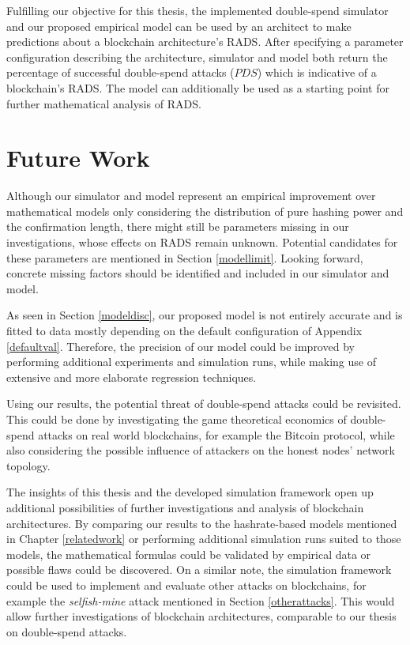 \documentclass[a4paper,12pt,twoside]{report}
\begin{document}
Fulfilling our objective for this thesis, the implemented double-spend simulator and our proposed empirical model can be used by an architect to make predictions about a blockchain architecture's RADS. After specifying a parameter configuration describing the architecture, simulator and model both return the percentage of successful double-spend attacks ($PDS$) which is indicative of a blockchain's RADS. The model can additionally be used as a starting point for further mathematical analysis of RADS.
\section{Future Work}
Although our simulator and model represent an empirical improvement over mathematical models only considering the distribution of pure hashing power and the confirmation length, there might still be parameters missing in our investigations, whose effects on RADS remain unknown. Potential candidates for these parameters are mentioned in Section \ref{modellimit}. Looking forward, concrete missing factors should be identified and included in our simulator and model.

As seen in Section \ref{modeldisc}, our proposed model is not entirely accurate and is fitted to data mostly depending on the default configuration of Appendix \ref{defaultval}. Therefore, the precision of our model could be improved by performing additional experiments and simulation runs, while making use of extensive and more elaborate regression techniques.

Using our results, the potential threat of double-spend attacks could be revisited. This could be done by investigating the game theoretical economics of double-spend attacks on real world blockchains, for example the Bitcoin protocol, while also considering the possible influence of attackers on the honest nodes' network topology.

The insights of this thesis and the developed simulation framework open up additional possibilities of further investigations and analysis of blockchain architectures. By comparing our results to the hashrate-based models mentioned in Chapter \ref{relatedwork} or performing additional simulation runs suited to those models, the mathematical formulas could be validated by empirical data or possible flaws could be discovered. On a similar note, the simulation framework could be used to implement and evaluate other attacks on blockchains, for example the \textit{selfish-mine} attack mentioned in Section \ref{otherattacks}. This would allow further investigations of blockchain architectures, comparable to our thesis on double-spend attacks. 
\end{document}
